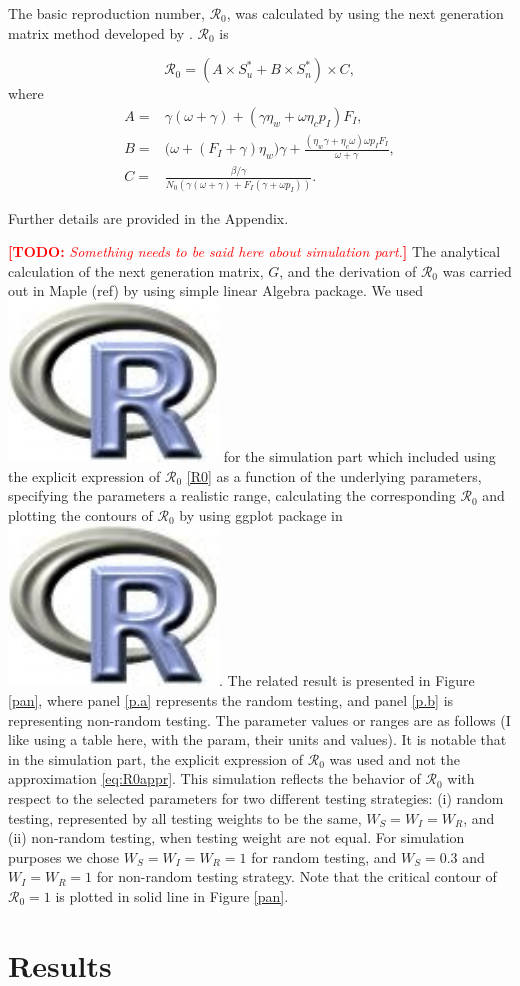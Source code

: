 \documentclass[12pt]{article}
\newcommand{\Rlogo}{\protect\includegraphics[height=2ex,keepaspectratio]
{pix/Rlogo.pdf}\xspace}
\newcommand{\comment}{\showcomment}
\newcommand{\showcomment}[3]{\textcolor{#1}{\textbf{[#2: }\textsl{#3}\textbf{]}}}
\newcommand{\todo}[1]{\comment{red}{TODO}{#1}}
\newcommand{\Rnum}{\mathcal{R}_0}
\theoremstyle{definition} %
\begin{document}
The basic reproduction number, $\Rnum$, was calculated by using the next generation matrix method developed by \cite{van2002reproduction}. $\Rnum$ is

\begin{equation}
\label{R0}
\Rnum= (A \times S_u^* + B \times S_n^*) \times C, 
\end{equation}
where
\begin{align*}
A=& \gamma(\omega+\gamma) + (\gamma \eta_w + \omega \eta_c p_I) F_I, \\
B=& \big(\omega+(F_I+\gamma)\eta_w\big) \gamma+\frac{(\eta_w \gamma+ \eta_c\omega) \omega p_I F_I }{\omega+\gamma}, \\ 
C=& \frac{\beta/\gamma}{N_0 (\gamma(\omega+\gamma)+F_I(\gamma+\omega p_I))}.
\end{align*}

Further details are provided in the Appendix.
 
\todo{Something needs to be said here about simulation part.} The analytical calculation of the next generation matrix, $G$, and the derivation of $\Rnum$ was carried out in Maple (ref) by using simple linear Algebra package. 
  We used \Rlogo for the simulation part which included using the explicit expression of $\Rnum$ \ref{R0} as a function of the underlying parameters, specifying the parameters a realistic range, calculating the corresponding $\Rnum$ and plotting the contours of $\Rnum$ by using ggplot package in \Rlogo. The related result is presented in Figure \ref{pan}, where  panel \eqref{p.a} represents the random testing, and panel \eqref{p.b} is representing non-random testing. The parameter values or ranges are as follows (I like using a table here, with the param, their units and values). It is notable that in the simulation part, the explicit expression of $\Rnum$ was used and not the approximation \eqref{eq:R0appr}. This simulation reflects the behavior of $\Rnum$ with respect to the selected parameters for two different testing strategies: (i) random testing, represented by all testing weights to be the same, $W_S=W_I=W_R$, and (ii) non-random testing, when testing weight are not equal. For simulation purposes we chose $W_S=W_I=W_R=1$ for random testing, and $W_S=0.3$ and $W_I=W_R=1$ for non-random testing strategy. Note that the critical contour of $\Rnum=1$ is plotted in solid line in Figure \ref{pan}. 


\section{Results}
\end{document}
